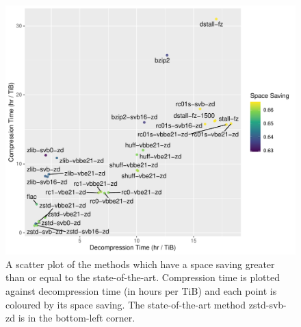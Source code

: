 \begin{figure}
\centering
\includegraphics[scale=0.7]{plots/reads.blow5.test.ct-dt.pdf}
	\caption[A scatter plot of the methods which
	have a space saving greater than or equal to the state-of-the-art.]{\label{fig:results-ct-dt}A scatter plot of the methods which
	have a space saving greater than or equal to the state-of-the-art.
	Compression time is plotted against decompression time (in hours per
	TiB) and each point is coloured by its space saving. The
	state-of-the-art method zstd-svb-zd is in the bottom-left corner.}
\end{figure}
